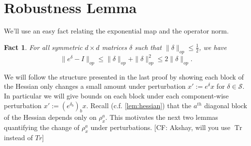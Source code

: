 \documentclass{article}
\newtheorem{corollary}[theorem]{Corollary}
\newtheorem{fact}[theorem]{Fact}
\newcommand{\R}{{\mathbb{R}}}
\newcommand\Sym{\mathcal{S}}
\newcommand\samp{x}
\newcommand\tr{\operatorname{Tr}}
\newcommand{\CF}[1]{{\color{purple}[CF: #1]}}
\begin{document}


\section{Robustness Lemma}

We'll use an easy fact relating the exponential map and the operator norm.

\begin{fact} For all symmetric $d\times d$ matrices $\delta $ such that $ \|\delta\|_{op} \leq \frac{1}{2}$, we have 
$$ \|e^{\delta} - I\|_{op} \leq \|\delta\|_{op} + \|\delta\|_{op}^{2} \leq 2 \|\delta\|_{op}.$$ 
\end{fact}

We will follow the structure presented in the last proof %
by showing each block of the Hessian only changes a small amount under perturbation $x' := e^{\delta} x$ for $\delta \in \Sym$. In particular we will give bounds on each block under each component-wise perturbation $x' := (e^{\delta_{b}})_{b} x$. Recall (c.f. \cref{lem:hessian}) that the $a^{th}$ diagonal block of the Hessian depends only on $\rho^a_{\samp}$. This motivates the next two lemmas quantifying the change of $\rho^{a}
_{\samp}$ under perturbations. \CF{Akshay, will you use $\tr$ instead of $Tr$}
\end{document}
